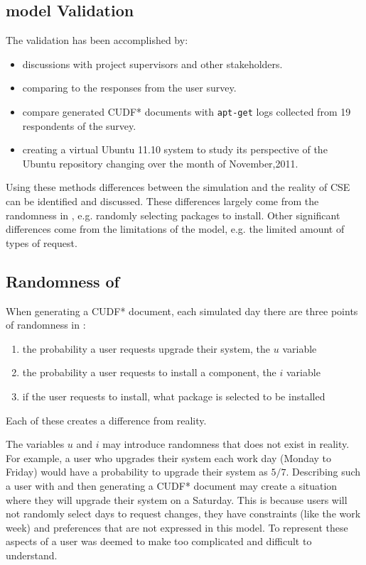 \subsection{\usermodel model Validation}
\label{sim.modelvalidation}
The \usermodel validation has been accomplished by:
\begin{itemize}
  \item discussions with project supervisors and other stakeholders.
  \item comparing \usermodel to the responses from the user survey.
  \item compare generated CUDF* documents with \texttt{apt-get} logs collected from 19 respondents of the survey.
  \item creating a virtual Ubuntu 11.10 system to study its perspective of the Ubuntu repository changing over the month of November,2011.
\end{itemize}

Using these methods differences between the simulation and the reality of CSE can be identified and discussed.
These differences largely come from the randomness in \usermodel, e.g. randomly selecting packages to install.
Other significant differences come from the limitations of the model, e.g. the limited amount of types of request.


\subsection{Randomness of \usermodel}
When generating a CUDF* document, each simulated day there are three points of randomness in \usermodel:
\begin{enumerate}
  \item the probability a user requests upgrade their system, the $u$ variable
  \item the probability a user requests to install a component, the $i$ variable
  \item  if the user requests to install, what package is selected to be installed
\end{enumerate}
Each of these creates a difference from reality.

The variables $u$ and $i$ may introduce randomness that does not exist in reality.
For example, a user who upgrades their system each work day (Monday to Friday) would have a probability to upgrade their system as $5/7$.
Describing such a user with \usermodel and then generating a CUDF* document may create a situation where they will upgrade their system on a Saturday.
This is because users will not randomly select days to request changes, they have constraints (like the work week) and preferences that are not expressed in this model.
To represent these aspects of a user was deemed to make \usermodel too complicated and difficult to understand. 

